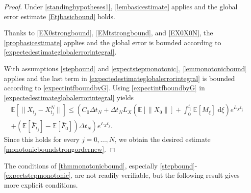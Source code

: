\documentclass[reqno,12pt]{amsart}
\theoremstyle{plain} %
\theoremstyle{definition} %
\begin{document}
\begin{proof}
    Under \cref{standinghypotheses1}, \cref{lembasicestimate} applies and the global error estimate \eqref{Etjbasicbound} holds.
    
    Thanks to \eqref{EX0strongbound}, \eqref{EMtstrongbound}, and \eqref{EX0X0N}, the \cref{propbasicestimate} applies and the global error is bounded according to \eqref{expectedestimateglobalerrorintegral}.
    
    With assumptions \eqref{stepbound} and \eqref{expectstepmonotonic}, \cref{lemmonotonicbound} applies and the last term in \eqref{expectedestimateglobalerrorintegral} is bounded according to \eqref{expectintfboundbyG}. Using \eqref{expectintfboundbyG} in \eqref{expectedestimateglobalerrorintegral} yields
    \begin{multline*}
        \mathbb{E} \left[\|X_{t_j} - X_{t_j}^N\|\right] \leq \left( C_0 \Delta t_N + \Delta t_N L_X \left(\mathbb{E}[\|X_0\|] + \int_0^{t_j} \mathbb{E}[M_\xi]\;\mathrm{d}\xi\right)e^{L_X t_j}\right. \\
        \left. + (\mathbb{E}[\bar F_{t_j}] - \mathbb{E}[\bar F_0])\Delta t_N\right) e^{L_X t_j}.
    \end{multline*}
    Since this holds for every $j=0, \ldots, N$, we obtain the desired estimate \eqref{monotonicboundstrongordernew}.
\end{proof}

The conditions of \cref{thmmonotonicbound}, especially \eqref{stepbound}-\eqref{expectstepmonotonic}, are not readily verifiable, but the following result gives more explicit conditions.
\end{document}
